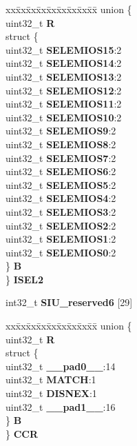 \begin{DoxyCompactItemize}
\begin{tabbing}
\end{tabbing}\item 
\mbox{\label{structSIU__tag_adfe50207ecf41492b39ff12c3f878d89}} 
\begin{tabbing}
xx\=xx\=xx\=xx\=xx\=xx\=xx\=xx\=xx\=\kill
union \{\\
\>uint32\_t {\bfseries R}\\
\>struct \{\\
\>\>uint32\_t {\bfseries SELEMIOS15}:2\\
\>\>uint32\_t {\bfseries SELEMIOS14}:2\\
\>\>uint32\_t {\bfseries SELEMIOS13}:2\\
\>\>uint32\_t {\bfseries SELEMIOS12}:2\\
\>\>uint32\_t {\bfseries SELEMIOS11}:2\\
\>\>uint32\_t {\bfseries SELEMIOS10}:2\\
\>\>uint32\_t {\bfseries SELEMIOS9}:2\\
\>\>uint32\_t {\bfseries SELEMIOS8}:2\\
\>\>uint32\_t {\bfseries SELEMIOS7}:2\\
\>\>uint32\_t {\bfseries SELEMIOS6}:2\\
\>\>uint32\_t {\bfseries SELEMIOS5}:2\\
\>\>uint32\_t {\bfseries SELEMIOS4}:2\\
\>\>uint32\_t {\bfseries SELEMIOS3}:2\\
\>\>uint32\_t {\bfseries SELEMIOS2}:2\\
\>\>uint32\_t {\bfseries SELEMIOS1}:2\\
\>\>uint32\_t {\bfseries SELEMIOS0}:2\\
\>\} {\bfseries B}\\
\} {\bfseries ISEL2}\\

\end{tabbing}\item 
\mbox{\label{structSIU__tag_ac34db9c5407a0535374d219018a44412}} 
int32\+\_\+t {\bfseries S\+I\+U\+\_\+reserved6} \mbox{[}29\mbox{]}
\item 
\mbox{\label{structSIU__tag_a29a9343c85565dd2d824fdde23661917}} 
\begin{tabbing}
xx\=xx\=xx\=xx\=xx\=xx\=xx\=xx\=xx\=\kill
union \{\\
\>uint32\_t {\bfseries R}\\
\>struct \{\\
\>\>uint32\_t {\bfseries \_\_pad0\_\_}:14\\
\>\>uint32\_t {\bfseries MATCH}:1\\
\>\>uint32\_t {\bfseries DISNEX}:1\\
\>\>uint32\_t {\bfseries \_\_pad1\_\_}:16\\
\>\} {\bfseries B}\\
\} {\bfseries CCR}\\


\end{tabbing}
\end{DoxyCompactItemize}
